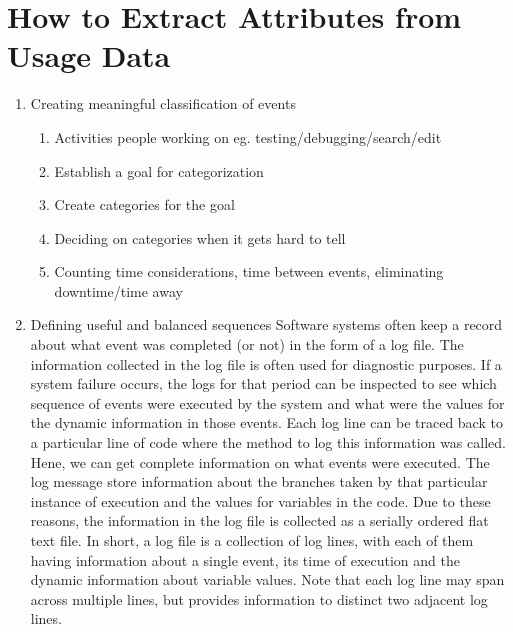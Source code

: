 \section{ How to Extract Attributes from Usage Data}


  \begin{enumerate}
  \item Creating meaningful classification of events
	\begin{enumerate}
	\item
	Activities people working on eg. testing/debugging/search/edit
	\item
	Establish a goal for categorization
	\item
	Create categories for the goal
	\item
	Deciding on categories when it gets hard to tell
	\item
	Counting time considerations, time between events, eliminating downtime/time away
	\end{enumerate}
  \item Defining useful and balanced sequences %
Software systems often keep a record about what event was completed (or not) in the form of a log file. The information collected in the log file is often used for diagnostic purposes. If a system failure occurs, the logs for that period can be inspected to see which sequence of events were executed by the system and what were the values for the dynamic information in those events. Each log line can be traced back to a particular line of code where the method to log this information was called. Hene, we can get complete information on what events were executed. The log message store information about the branches taken by that particular instance of execution and the values for variables in the code. Due to these reasons, the information in the log file is collected as a serially ordered flat text file. In short, a log file is a collection of log lines, with each of them having information about a single event, its time of execution and the dynamic information about variable values. Note that each log line may span across multiple lines, but provides information to distinct two adjacent log lines.


\end{enumerate}
